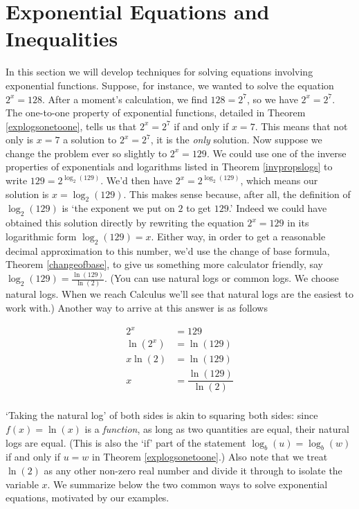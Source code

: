 \section{Exponential Equations and Inequalities}

\label{ExpEquations}

In this section we will develop techniques for solving equations involving exponential functions.  Suppose, for instance,  we wanted to solve the equation $2^{x} = 128$.  After a moment's calculation, we find $128 = 2^{7}$, so we have $2^{x} = 2^{7}$.  The one-to-one property of exponential functions, detailed in Theorem \ref{explogsonetoone}, tells us that $2^{x} = 2^{7}$ if and only if $x=7$.  This means that not only is $x=7$ a solution to $2^{x} = 2^{7}$, it is the \textit{only} solution.  Now suppose we change the problem ever so slightly to $2^{x} = 129$.  We could use one of the inverse properties of exponentials and logarithms listed in Theorem \ref{invpropslogs} to write $129 = 2^{\log_{2}(129)}$.  We'd then have $2^{x} = 2^{\log_{2}(129)}$, which means our solution is $x = \log_{2}(129)$. This makes sense because, after all, the definition of $\log_{2}(129)$ is `the exponent we put on $2$ to get $129$.' Indeed we could have obtained this solution directly by rewriting the equation $2^{x} = 129$ in its logarithmic form $\log_{2}(129) = x$.  Either way, in order to get a reasonable decimal approximation to this number, we'd use the change of base formula, Theorem \ref{changeofbase}, to give us something more calculator friendly, say $\log_{2}(129) = \frac{\ln(129)}{\ln(2)}$. (You can use natural logs or common logs.  We choose natural logs.  When we reach Calculus we'll see that natural logs are the easiest to work with.) Another way to arrive at this answer is as follows



\begin{align*}
2^{x} & =  129  \\
\ln\left(2^{x}\right) & =  \ln(129) \tag*{Take the natural log of both sides.} \\
x \ln(2) & =  \ln(129)  \tag*{Power Rule} \\ 
x & = \dfrac{\ln(129)}{\ln(2)}  \\
\end{align*}

`Taking the natural log' of both sides is akin to squaring both sides: since $f(x) = \ln(x)$ is a \textit{function}, as long as two quantities are equal, their natural logs are equal. (This is also the `if' part of the statement $\log_{b}(u) = \log_{b}(w)$ if and only if $u=w$ in Theorem \ref{explogsonetoone}.) Also note that we treat $\ln(2)$ as any other non-zero real number and divide it through  to isolate the variable $x$.  We summarize below the two common ways to solve exponential equations, motivated by our examples.

